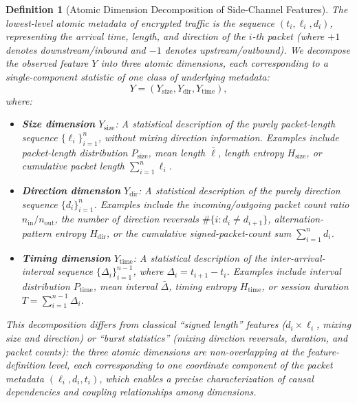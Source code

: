 \documentclass[lettersize,journal]{IEEEtran}
\newtheorem{definition}{Definition}
\begin{document}
\begin{definition}[Atomic Dimension Decomposition of Side-Channel Features]
\label{def:multi-dim}
The lowest-level atomic metadata of encrypted traffic is the sequence
$(t_i, \ell_i, d_i)$, representing the arrival time, length, and direction
of the $i$-th packet (where $+1$ denotes downstream/inbound and $-1$
denotes upstream/outbound).
We decompose the observed feature $Y$ into three \emph{atomic dimensions},
each corresponding to a single-component statistic of one class of
underlying metadata:
\begin{equation}\label{eq:multi-dim}
Y = (Y_{\mathrm{size}}, Y_{\mathrm{dir}}, Y_{\mathrm{time}}),
\end{equation}
where:
\begin{itemize}
\item \textbf{Size dimension} $Y_{\mathrm{size}}$: A statistical
  description of the \emph{purely} packet-length sequence
  $\{\ell_i\}_{i=1}^n$, \emph{without} mixing direction information.
  Examples include packet-length distribution $P_{\mathrm{size}}$, mean
  length $\bar\ell$, length entropy $H_{\mathrm{size}}$, or cumulative
  packet length $\sum_{i=1}^n \ell_i$.

\item \textbf{Direction dimension} $Y_{\mathrm{dir}}$: A statistical
  description of the \emph{purely} direction sequence $\{d_i\}_{i=1}^n$.
  Examples include the incoming/outgoing packet count ratio
  $n_{\mathrm{in}}/n_{\mathrm{out}}$, the number of direction reversals
  $\#\{i: d_i \neq d_{i+1}\}$, alternation-pattern entropy
  $H_{\mathrm{dir}}$, or the cumulative signed-packet-count sum
  $\sum_{i=1}^n d_i$.

\item \textbf{Timing dimension} $Y_{\mathrm{time}}$: A statistical
  description of the inter-arrival-interval sequence
  $\{\Delta_i\}_{i=1}^{n-1}$, where $\Delta_i=t_{i+1}-t_i$.
  Examples include interval distribution $P_{\mathrm{time}}$, mean
  interval $\bar\Delta$, timing entropy $H_{\mathrm{time}}$, or session
  duration $T=\sum_{i=1}^{n-1}\Delta_i$.
\end{itemize}
This decomposition differs from classical ``signed length'' features
($d_i \times \ell_i$, mixing size and direction) or ``burst statistics''
(mixing direction reversals, duration, and packet counts): the three atomic
dimensions are non-overlapping at the feature-definition level, each
corresponding to one coordinate component of the packet metadata
$(\ell_i, d_i, t_i)$, which enables a precise characterization of
causal dependencies and coupling relationships among dimensions.
\end{definition}
\end{document}
